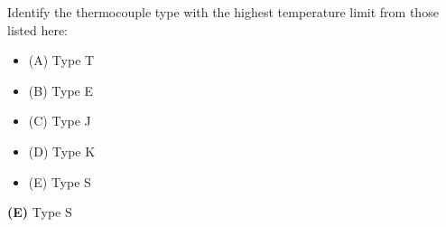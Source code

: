 

Identify the thermocouple type with the highest temperature limit from those listed here:

\begin{itemize}
\item{(A)} Type T
\vskip 5pt 
\item{(B)} Type E
\vskip 5pt 
\item{(C)} Type J
\vskip 5pt 
\item{(D)} Type K
\vskip 5pt 
\item{(E)} Type S
\end{itemize}







{\bf (E)} Type S
 









